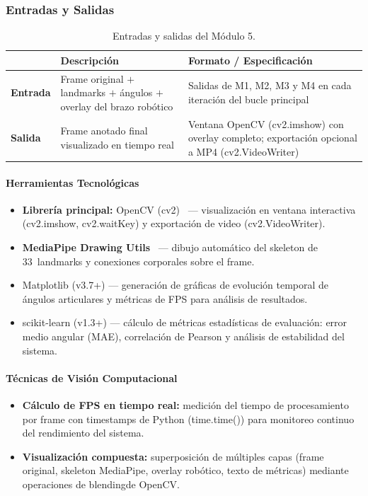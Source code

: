 \subsubsection*{Entradas y Salidas}

\begin{table}[h!]
\centering
\label{tab:m1_io}
\renewcommand{\arraystretch}{1.3}
\begin{tabularx}{\textwidth}{
    >{\bfseries}p{3cm}
    X
    X
}    
\toprule
&
\textbf{Descripción} &
\textbf{Formato / Especificación} \\
\midrule
Entrada &
  Frame original $+$ landmarks $+$ ángulos $+$
  overlay del brazo robótico &
  Salidas de M1, M2, M3 y M4 en cada iteración del
  bucle principal \\
\midrule
Salida &
  Frame anotado final visualizado en tiempo real &
  Ventana OpenCV (cv2.imshow) con overlay
  completo; exportación opcional a MP4
  (cv2.VideoWriter) \\
\bottomrule
\end{tabularx}
\caption{Entradas y salidas del Módulo 5.}
\end{table}
 
\paragraph{Herramientas Tecnológicas}
\begin{itemize}[leftmargin=1.5em]
  \item \textbf{Librería principal:}
        OpenCV (cv2)~\cite{Bradski2000} — visualización
        en ventana interactiva (cv2.imshow,
        cv2.waitKey) y exportación de video
        (cv2.VideoWriter).
  \item \textbf{MediaPipe Drawing Utils}~\cite{Lugaresietal2019}
        — dibujo automático del skeleton de 33~landmarks y
        conexiones corporales sobre el frame.
  \item Matplotlib (v3.7+) — generación de gráficas de
        evolución temporal de ángulos articulares y métricas de FPS
        para análisis de resultados.
  \item scikit-learn (v1.3+) — cálculo de métricas
        estadísticas de evaluación: error medio angular (MAE),
        correlación de Pearson y análisis de estabilidad del sistema.
\end{itemize}
 
\paragraph{Técnicas de Visión Computacional}
\begin{itemize}[leftmargin=1.5em]
  \item \textbf{Cálculo de FPS en tiempo real:} medición del tiempo
        de procesamiento por frame con timestamps de Python
        (time.time()) para monitoreo continuo del rendimiento
        del sistema.
  \item \textbf{Visualización compuesta:} superposición de múltiples
        capas (frame original, skeleton MediaPipe,
        overlay robótico, texto de métricas) mediante
        operaciones de blendingde OpenCV.
\end{itemize}

